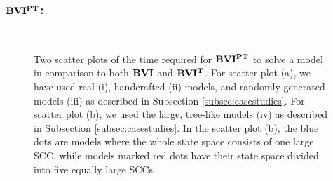 \subsubsection*{\underline{$\TOPAlg$}:}
\begin{figure}[h!]
    \centering
    \
    \caption[$\TOPAlg$ compared to $\BVI$ with and without the topological optimization]{
        Two scatter plots of the time required for $\TOPAlg$ to solve a model in comparison to both $\BVI$ and $\mathbf{BVI^T}$.
        For scatter plot (a), we have used real (i), handcrafted (ii) models, and randomly generated models (iii) as described in Subsection \ref{subsec:casestudies}.
        For scatter plot (b), we used the large, tree-like models (iv) as described in Subsection \ref{subsec:casestudies}. In the scatter plot (b),
        the blue dots are models where the whole state space consists of one large SCC, while models marked red dots have their state space divided into five equally large SCCs.
    }
    \label{fig:colorScatterBviTop}
\end{figure}

